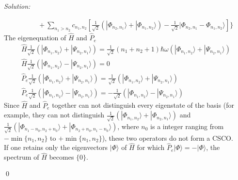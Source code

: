 \documentclass[12pt,a4paper]{article}
\newenvironment{sol}
    {\emph{Solution:}
    }
    {
    \qed
    }
\begin{document}
\begin{sol}
\begin{itemize}
\begin{align}
&\quad\quad+\sum_{n_1>n_2}c_{n_1,n_2}[\frac{1}{\sqrt{2}}(|\Phi_{n_2,n_1}\rangle+|\Phi_{n_1,n_2}\rangle)-\frac{1}{\sqrt{2}}|\Phi_{n_2,n_1}-\Phi_{n_1,n_2}\rangle]\}
\end{align}
The eigenequation of $\hat{H}$ and $\hat{P}_e$
\begin{gather}
\hat{H}\frac{1}{\sqrt{2}}(|\Phi_{n_1,n_2}\rangle+|\Psi_{n_2,n_1}\rangle)=\frac{1}{\sqrt{2}}(n_1+n_2+1)\hbar\omega(|\Phi_{n_1,n_2}\rangle+|\Psi_{n_2,n_1}\rangle)\\
\hat{H}\frac{1}{\sqrt{2}}(|\Phi_{n_1,n_2}\rangle-|\Psi_{n_2,n_1}\rangle)=0\\
\hat{P}_e\frac{1}{\sqrt{2}}(|\Phi_{n_1,n_2}\rangle+|\Psi_{n_2,n_1}\rangle)=\frac{1}{\sqrt{2}}(|\Phi_{n_1,n_2}\rangle+|\Psi_{n_2,n_1}\rangle)\\
\hat{P}_e\frac{1}{\sqrt{2}}(|\Phi_{n_1,n_2}\rangle-|\Psi_{n_2,n_1}\rangle)=-\frac{1}{\sqrt{2}}(|\Phi_{n_1,n_2}\rangle-|\Psi_{n_2,n_1}\rangle)
\end{gather}
Since $\hat{H}$ and $\hat{P}_e$ together can not distinguish every eigenstate of the basis (for example, they can not distinguish $\frac{1}{\sqrt{2}}(|\Phi_{n_1,n_2}\rangle+|\Phi_{n_2,n_1}\rangle)$ and $\frac{1}{\sqrt{2}}(|\Phi_{n_1-n_0,n_2+n_0}\rangle+|\Phi_{n_2+n_0,n_1-n_0}\rangle)$, where $n_0$ is a integer ranging from $-\min\{n_1,n_2\}$ to $+\min\{n_1,n_2\}$), these two operators do not form a CSCO.\\
If one retains only the eigenvectors $|\Phi\rangle$ of $\hat{H}$ for which $\hat{P}_e|\Phi\rangle=-|\Phi\rangle$, the spectrum of $\hat{H}$ becomes $\{0\}$.
\end{itemize}
\end{sol}
\end{document}
